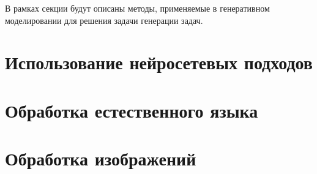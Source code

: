 В рамках секции будут описаны методы, применяемые в генеративном моделировании
для решения задачи генерации задач.


\section{Использование нейросетевых подходов}



\section{Обработка естественного языка}




\section{Обработка изображений}




